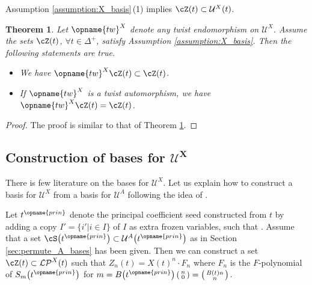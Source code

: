 \documentclass[pdftex]{sigma}
\renewcommand{\tw}{\opname{tw}}
\newcommand{\upClAlg}{\mathcal{U}^A}
\newcommand{\XClAlg}{\mathcal{U}^X}
\newcommand{\LP}{{\mathcal{LP}}}
\newcommand{\Id}{{\opname{Id}}}
\newcommand{\prin}{{\opname{prin}}}
\renewcommand{\tw}{\opname{tw}}
\numberwithin{equation}{section}
\newtheorem{Theorem}{Theorem}[section]
\begin{document}
Assumption \ref{assumption:X_basis}\,(1) implies $\cZ(t)\subset\XClAlg(t)$.

\begin{Theorem}\label{thm:twist_X_basis}
Let $\tw^{X}$ denote any twist endomorphism on $\XClAlg$. Assume
the sets $\cZ(t)$, $\forall t\in\Delta^{+}$, satisfy Assumption
{\rm \ref{assumption:X_basis}}. Then the following statements are true.
\begin{itemize}\itemsep=0pt
\item[$(1)$] We have $\tw^{X}\cZ(t)\subset\cZ(t)$.
\item[$(2)$] If $\tw^{X}$ is a twist automorphism, we have $\tw^{X}\cZ(t)=\cZ(t)$.
\end{itemize}
\end{Theorem}

\begin{proof}
The proof is
similar to that of Theorem \ref{thm:twist_X_basis}.
\end{proof}

\subsection[Construction of bases for U\^{}X]{Construction of bases for $\boldsymbol{\XClAlg}$}\label{sec:construction_X_bases}

There is few literature on the bases for $\XClAlg$. Let us explain
how to construct a basis for $\XClAlg$ from a basis for $\upClAlg$
following the idea of \cite{gross2018canonical}.

Let $t^{\prin}$ denote the principal coefficient seed constructed
from $t$ by adding a copy ${I'\!=\!\{i'|i\in I\}}$ of $I$ as extra frozen
variables, such that \smash{$B\big(t^{\prin}\big)=\left(\begin{smallmatrix}
B(t) & -\Id\\
\Id & 0
\end{smallmatrix}\right)$}. Assume that a set $\cS\big(t^{\prin}\big)\subset \upClAlg\big(t^{\prin}\big)$ as in Section \ref{sec:permute_A_bases} has been given. Then we
can construct a set $\cZ(t)\subset\LP^{X}(t)$ such that $Z_{n}(t)=X(t)^{n}\cdot F_{n}$
where $F_{n}$ is the $F$-polynomial of $S_{m}\big(t^{\prin}\big)$ for $m=B\big(t^{\prin}\big)\left(\begin{smallmatrix}
 n\\
 0
 \end{smallmatrix}\right)=\left(\begin{smallmatrix}
B(t)n\\
n
\end{smallmatrix}\right)$.
\end{document}
